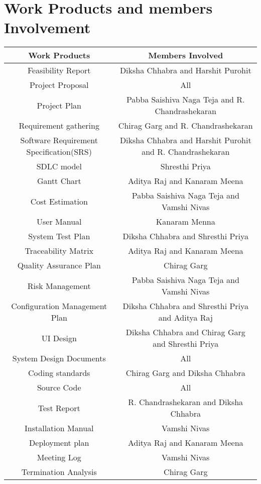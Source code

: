 \documentclass{article}
\begin{document}
\section{Work Products and members Involvement}
\begin{center}
\begin{tabular}{|c|c|}
\hline
\textbf{Work Products} & \textbf{ Members Involved} \\ \hline
 Feasibility Report &  Diksha Chhabra and Harshit Purohit \\ \hline
 Project Proposal &  All \\ \hline
 Project Plan & Pabba Saishiva Naga Teja and  R. Chandrashekaran \\ \hline
 Requirement gathering & Chirag Garg  and  R. Chandrashekaran\\ \hline
 Software Requirement Specification(SRS) &  Diksha Chhabra and Harshit Purohit and R. Chandrashekaran \\ \hline
 SDLC model & Shresthi Priya \\ \hline
 Gantt Chart & Aditya Raj and Kanaram Meena \\ \hline
 Cost Estimation &  Pabba Saishiva Naga Teja and Vamshi Nivas \\ \hline
 User Manual & Kanaram Menna \\ \hline
 System Test Plan & Diksha Chhabra and Shresthi Priya \\ \hline
 Traceability Matrix & Aditya Raj and Kanaram Meena \\ \hline
 Quality Assurance Plan & Chirag Garg \\ \hline
 Risk Management & Pabba Saishiva Naga Teja and Vamshi Nivas\\ \hline
 Configuration Management Plan & Diksha Chhabra and Shresthi Priya and Aditya Raj\\ \hline
 UI Design & Diksha Chhabra and Chirag Garg and Shresthi Priya \\ \hline
System Design Documents &  All \\ \hline
Coding standards & Chirag Garg and Diksha Chhabra \\ \hline
Source Code & All \\ \hline
Test Report & R. Chandrashekaran and Diksha Chhabra \\ \hline
Installation Manual & Vamshi Nivas \\ \hline
Deployment plan & Aditya Raj and Kanaram Meena \\ \hline
Meeting Log & Vamshi Nivas \\ \hline
Termination Analysis & Chirag Garg \\ \hline

\end{tabular}
\end{center}
\end{document}
